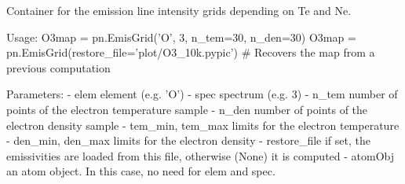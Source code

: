 \begin{DoxyVerb}Container for the emission line intensity grids depending on Te and Ne.

Usage:
    O3map = pn.EmisGrid('O', 3, n_tem=30, n_den=30)
    O3map = pn.EmisGrid(restore_file='plot/O3_10k.pypic') # Recovers the map from a previous computation

Parameters:
    - elem               element (e.g. 'O')
    - spec               spectrum (e.g. 3)
    - n_tem              number of points of the electron temperature sample
    - n_den              number of points of the electron density sample
    - tem_min, tem_max   limits for the electron temperature
    - den_min, den_max   limits for the electron density
    - restore_file       if set, the emissivities are loaded from this file, 
                 otherwise (None) it is computed
    - atomObj            an atom object. In this case, no need for elem and spec.\end{DoxyVerb}
 

